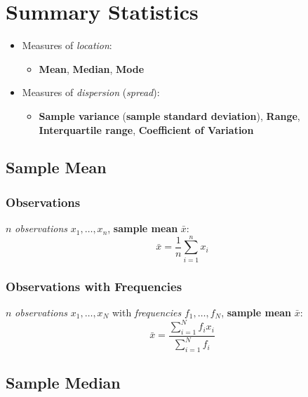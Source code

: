 \section*{Summary Statistics}

\begin{itemize}
    \item Measures of \textit{location}:
    \begin{itemize}
        \item \textbf{Mean}, \textbf{Median}, \textbf{Mode}
    \end{itemize}
    \item Measures of \textit{dispersion} (\textit{spread}):
    \begin{itemize}
        \item \textbf{Sample variance} (\textbf{sample standard deviation}), \textbf{Range}, \textbf{Interquartile range}, \textbf{Coefficient of Variation}
    \end{itemize}
\end{itemize}

\subsection*{Sample Mean}

\subsubsection*{Observations}

$n$ \textit{observations} $x_1, \dots, x_n$, \textbf{sample mean} $\bar{x}$:
\begin{equation*}
    \bar{x} = \frac{1}{n} \sum \limits_{i = 1}^{n} x_i
\end{equation*}

\subsubsection*{Observations with Frequencies}

$n$ \textit{observations} $x_1, \dots, x_N$ with \textit{frequencies} $f_1, \dots, f_N$, \textbf{sample mean} $\bar{x}$:
\begin{equation*}
    \bar{x} = \frac{
        \sum \limits_{i = 1}^{N} f_i x_i
    }{
        \sum \limits_{i = 1}^{N} f_i
    }
\end{equation*}

\subsection*{Sample Median}

